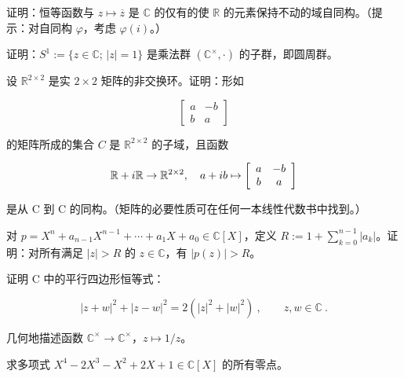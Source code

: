 \begin{exercises}
\item

证明：恒等函数与 $ z \mapsto \overline{z} $ 是 $\mathbb{C}$ 的仅有的使 $\mathbb{R}$ 的元素保持不动的域自同构。（提示：对自同构 $ \varphi $，考虑 $ \varphi(i) $。）

\item

证明：$ S^1 := \{ z \in \mathbb{C} ; \, |z| = 1 \} $ 是乘法群 $ (\mathbb{C}^\times, \cdot) $ 的子群，即圆周群。

\item

设 $ \mathbb{R}^{2\times2} $ 是实 $ 2\times2 $ 矩阵的非交换环。证明：形如

\begin{equation*}
\left[\begin{array}{cc}a&-b\\ b&a\end{array}\right]
\end{equation*}

的矩阵所成的集合 $ C $ 是 $ \mathbb{R}^{2\times2} $ 的子域，且函数

\begin{equation*}
\mathbb{R}+i\mathbb{R}\to\mathbb{R}^{2\times2},\quad a+i b\mapsto\left[\begin{array}{c c}a&-b\\ b&a\end{array}\right]
\end{equation*}

是从 C 到 C 的同构。（矩阵的必要性质可在任何一本线性代数书中找到。）

\item

对 $ p = X^n + a_{n-1}X^{n-1} + \cdots + a_1X + a_0 \in \mathbb{C}[X] $，定义 $ R := 1 + \sum_{k=0}^{n-1} |a_k| $。证明：对所有满足 $ |z| > R $ 的 $ z \in \mathbb{C} $，有 $ |p(z)| > R $。

\item

证明 C 中的平行四边形恒等式：

\[
|z+w|^{2}+|z-w|^{2}=2(|z|^{2}+|w|^{2})~,\qquad z,w\in\mathbb{C}~.
\]
\item

几何地描述函数 $ \mathbb{C}^\times \to \mathbb{C}^\times $，$ z \mapsto 1/z $。

\item

求多项式 $ X^4 - 2X^3 - X^2 + 2X + 1 \in \mathbb{C}[X] $ 的所有零点。


\end{exercises}
